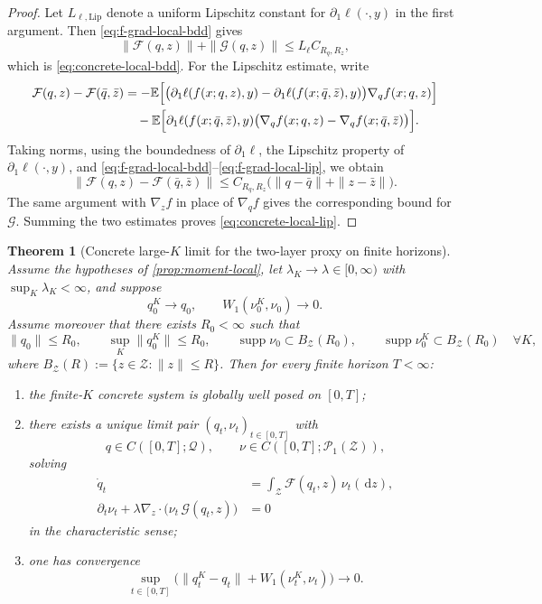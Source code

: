\documentclass{article}
\newtheorem{theorem}{Theorem}
\theoremstyle{definition}
\newcommand{\E}{\mathbb{E}}
\newcommand{\PP}{\mathcal{P}}
\newcommand{\W}{W_1}
\newcommand{\dd}{\,\mathrm{d}}
\begin{document}
\begin{proof}
Let $L_{\ell,\mathrm{Lip}}$ denote a uniform Lipschitz constant for $\partial_1\ell(\cdot,y)$ in the first argument. Then \eqref{eq:f-grad-local-bdd} gives
\[
  \|\mathcal F(q,z)\|+\|\mathcal G(q,z)\|
  \le
  L_\ell C_{R_q,R_z},
\]
which is \eqref{eq:concrete-local-bdd}. For the Lipschitz estimate, write
\begin{align*}
  \mathcal F(q,z)-\mathcal F(\bar q,\bar z)
  &=
  -\E
  \Bigl[
    \bigl(
      \partial_1\ell(f(x;q,z),y)
      -
      \partial_1\ell(f(x;\bar q,\bar z),y)
    \bigr)
    \nabla_q f(x;q,z)
  \Bigr]
  \\
  &\quad
  -\E
  \Bigl[
    \partial_1\ell(f(x;\bar q,\bar z),y)
    \bigl(
      \nabla_q f(x;q,z)
      -
      \nabla_q f(x;\bar q,\bar z)
    \bigr)
  \Bigr].
\end{align*}
Taking norms, using the boundedness of $\partial_1\ell$, the Lipschitz property of $\partial_1\ell(\cdot,y)$, and \eqref{eq:f-grad-local-bdd}--\eqref{eq:f-grad-local-lip}, we obtain
\[
  \|\mathcal F(q,z)-\mathcal F(\bar q,\bar z)\|
  \le
  C_{R_q,R_z}
  \bigl(
    \|q-\bar q\|+\|z-\bar z\|
  \bigr).
\]
The same argument with $\nabla_z f$ in place of $\nabla_q f$ gives the corresponding bound for $\mathcal G$. Summing the two estimates proves \eqref{eq:concrete-local-lip}.
\end{proof}

\begin{theorem}[Concrete large-$K$ limit for the two-layer proxy on finite horizons]
\label{thm:concrete-head-mf}
Assume the hypotheses of \cref{prop:moment-local}, let $\lambda_K\to\lambda\in[0,\infty)$ with $\sup_K\lambda_K<\infty$, and suppose
\[
  q_0^K\to q_0,
  \qquad
  \W(\nu_0^K,\nu_0)\to 0.
\]
Assume moreover that there exists $R_0<\infty$ such that
\[
  \|q_0\|\le R_0,
  \qquad
  \sup_K\|q_0^K\|\le R_0,
  \qquad
  \operatorname{supp}\nu_0\subset B_{\mathcal Z}(R_0),
  \qquad
  \operatorname{supp}\nu_0^K\subset B_{\mathcal Z}(R_0)
  \quad
  \forall K,
\]
where $B_{\mathcal Z}(R):=\{z\in\mathcal Z:\|z\|\le R\}$. Then for every finite horizon $T<\infty$:
\begin{enumerate}[leftmargin=2em]
  \item the finite-$K$ concrete system is globally well posed on $[0,T]$;
  \item there exists a unique limit pair $(q_t,\nu_t)_{t\in[0,T]}$ with
  \[
    q\in C([0,T];\mathcal Q),
    \qquad
    \nu\in C([0,T];\PP_1(\mathcal Z)),
  \]
  solving
  \begin{align}
    \dot q_t
    &=
    \int_{\mathcal Z}\mathcal F(q_t,z)\,\nu_t(\dd z),
    \label{eq:concrete-limit-q}
    \\
    \partial_t \nu_t
    +
    \lambda\nabla_z\cdot\bigl(\nu_t\,\mathcal G(q_t,z)\bigr)
    &=
    0
    \label{eq:concrete-limit-nu}
  \end{align}
  in the characteristic sense;
  \item one has convergence
  \[
    \sup_{t\in[0,T]}
    \bigl(
      \|q_t^K-q_t\|+\W(\nu_t^K,\nu_t)
    \bigr)
    \to 0.
  \]
\end{enumerate}
\end{theorem}
\end{document}

